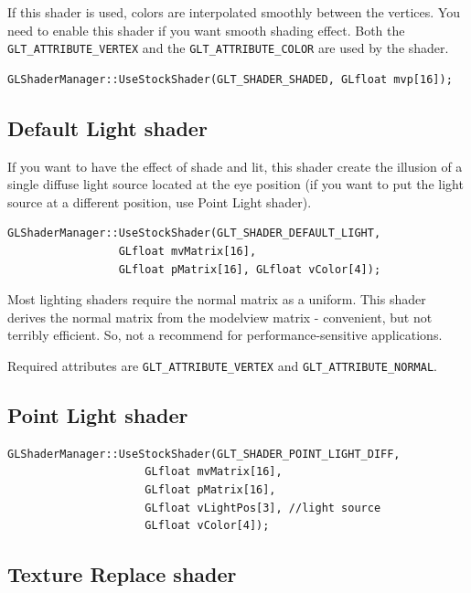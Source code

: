 If this shader is used, colors are interpolated smoothly between the
vertices. You need to enable this shader if you want smooth shading
effect.  Both the \verb!GLT_ATTRIBUTE_VERTEX! and the
\verb!GLT_ATTRIBUTE_COLOR! are used by the shader.

\begin{verbatim}
GLShaderManager::UseStockShader(GLT_SHADER_SHADED, GLfloat mvp[16]);
\end{verbatim}

\subsection{Default Light shader}
\label{sec:default-light-shader}

If you want to have the effect of shade and lit, this shader create
the illusion of a single diffuse light source located at the eye
position (if you want to put the light source at a different position,
use Point Light shader). 

\begin{verbatim}
GLShaderManager::UseStockShader(GLT_SHADER_DEFAULT_LIGHT, 
                 GLfloat mvMatrix[16],
                 GLfloat pMatrix[16], GLfloat vColor[4]);
\end{verbatim}

Most lighting shaders require the normal matrix as a uniform. This
shader derives the normal matrix from the modelview matrix - convenient,
but not terribly efficient. So, not a recommend for
performance-sensitive applications.


Required attributes are \verb!GLT_ATTRIBUTE_VERTEX! and
\verb!GLT_ATTRIBUTE_NORMAL!.

\subsection{Point Light shader}
\label{sec:point-light-shader}

\begin{verbatim}
GLShaderManager::UseStockShader(GLT_SHADER_POINT_LIGHT_DIFF, 
                     GLfloat mvMatrix[16],
                     GLfloat pMatrix[16], 
                     GLfloat vLightPos[3], //light source
                     GLfloat vColor[4]);
\end{verbatim}

\subsection{Texture Replace shader}
\label{sec:text-repl-shad}

